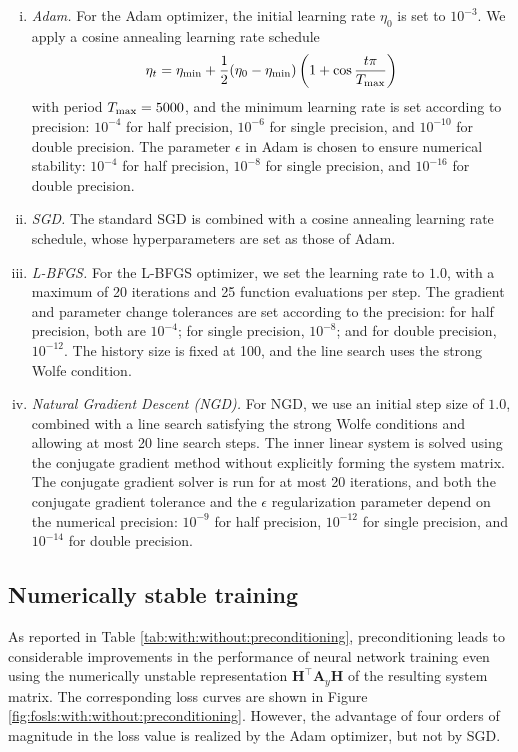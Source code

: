 \documentclass[a4paper,11pt]{amsart}
\numberwithin{equation}{section}
\theoremstyle{definition}
\theoremstyle{remark}
\theoremstyle{plain}
\begin{document}
\begin{enumerate}[(i)]
\item \emph{Adam.} For the Adam optimizer, the initial learning rate $\eta_{0}$ is set to $10^{-3}$. We apply a cosine annealing learning rate schedule
\[
\eta_t = \eta_{\min} + \frac{1}{2} (\eta_0 - \eta_{\min}) \left( 1 + \cos \frac{t \pi}{T_{\rm max}} \right)
\]
with period $T_{\rm max} = 5000$, and the minimum learning rate is set according to precision: $10^{-4}$ for half precision, $10^{-6}$ for single precision, and $10^{-10}$ for double precision. The parameter $\epsilon$ in Adam is chosen to ensure numerical stability: $10^{-4}$ for half precision, $10^{-8}$ for single precision, and $10^{-16}$ for double precision.
\item \emph{SGD.} 
The standard SGD is combined with a cosine annealing learning rate schedule, whose hyperparameters are set as those of Adam.
\item \emph{L-BFGS.} 
For the L-BFGS optimizer, we set the learning rate to $1.0$, with a maximum of 20 iterations and 25 function evaluations per step. The gradient and parameter change tolerances are set according to the precision: for half precision, both are $10^{-4}$; for single precision, $10^{-8}$; and for double precision, $10^{-12}$. The history size is fixed at 100, and the line search uses the strong Wolfe condition.
\item\emph{Natural Gradient Descent (NGD).}
For NGD, we use an initial step size of $1.0$, combined with a line search satisfying the strong Wolfe conditions and allowing at most 20 line search steps. The inner linear system is solved using the conjugate gradient method without explicitly forming the system matrix. The conjugate gradient solver is run for at most 20 iterations, and both the conjugate gradient tolerance and the $\epsilon$ regularization parameter depend on the numerical precision: $10^{-9}$ for half precision, $10^{-12}$ for single precision, and $10^{-14}$ for double precision.

\end{enumerate}

\subsection{Numerically stable training}

As reported in Table \ref{tab:with:without:preconditioning}, preconditioning leads to considerable improvements in the performance of neural network training even using the numerically unstable representation $\mathbf H^\intercal \mathbf A_y \mathbf H$ of the resulting system matrix. The corresponding loss curves are shown in Figure \ref{fig:fosls:with:without:preconditioning}. However, the advantage of four orders of magnitude in the loss value is realized by the Adam optimizer, but not by SGD.
\end{document}
